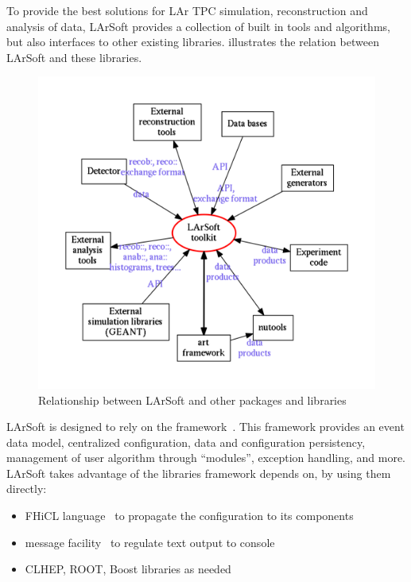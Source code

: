 
To provide the best solutions for LAr TPC simulation, reconstruction and
analysis of data, LArSoft provides a collection of built in tools and
algorithms, but also interfaces to other existing libraries.
 illustrates the relation between LArSoft and
these libraries.

\begin{figure}
	\includegraphics[width=\textwidth]{figures/LArSoftArchitectureSimplifiedGraph}
	\caption{\label{fig:LArSoftRelations}
		Relationship between LArSoft and other packages and libraries
	}
\end{figure}

LArSoft is designed to rely on the \ART framework~\cite{ART}.
This framework provides an event data model, centralized configuration, data
and configuration persistency, management of user algorithm through
``modules'', exception handling, and more. LArSoft takes advantage of
the libraries \ART framework depends on, by using them directly:

\begin{itemize}
\item
  FHiCL language~\cite{FHiCL} to propagate the configuration to its
  components
\item
  message facility~\cite{MessageFacility} to regulate text output to console
\item
  CLHEP, ROOT, Boost libraries as needed
\end{itemize}

